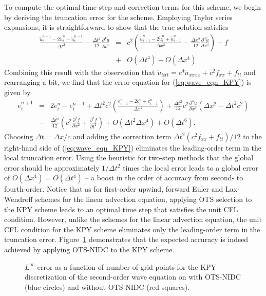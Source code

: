 \documentclass[fleqn,12pt,twoside]{article}
\newcommand{\bea}{\begin{eqnarray}}
\newcommand{\eea}{\end{eqnarray}}
\def\pt{\partial t}
\def\px{\partial x}
\def\tu{\tilde{u}}
\def\dt{\Delta t}
\def\dx{\Delta x}
\begin{document}
To compute the optimal time step and correction terms for this scheme, we
begin by deriving the truncation error for the scheme.  Employing Taylor 
series expansions, it is straightforward to show that the true solution 
satisfies
\bea
  \frac{\tu^{n+1}_i - 2 \tu^n_i + \tu^{n-1}_i}{\dt^2}
    - \frac{\dt^2}{12} \frac{\partial^4 \tu}{\pt^4}
  &=& c^2 \left( \frac{\tu^{n}_{i+1} - 2 \tu^n_i + \tu^n_{i-1}}{\dx^2}
  -\frac{\dx^2}{12} \frac{\partial^4 \tu}{\px^4} \right) + f
  \nonumber \\
  &+& O(\dt^4) + O(\dx^4) 
\eea
Combining this result with the observation that
$\tu_{tttt} = c^4 \tu_{xxxx} + c^2 f_{xx} + f_{tt}$ and rearranging a bit, 
we find that the error equation for (\ref{eq:wave_eqn_KPY}) is given by
\bea
  e^{n+1}_i &=& 2 e^n_i - e^{n-1}_i
  + \dt^2 c^2 \left( \frac{e^{n}_{i+1} - 2 e^n_i + e^n_{i-1}}{\dx^2} \right)
  + \frac{\dt^2}{12} c^2 \frac{\partial^4 \tu}{\px^4} 
    \left( \dx^2 - \dt^2 c^2 \right)
  \nonumber \\
  &-& \frac{\dt^4}{12} \left( c^2 \frac{\partial^2 f}{\px^2} 
                            + \frac{\partial^2 f}{\pt^2} \right)
      + O(\dt^2 \dx^4) + O(\dt^6).
\eea
Choosing $\dt = \dx/c$ and adding the correction term 
$\dt^2 \left(c^2 f_{xx} + f_{tt} \right)/12$ to the right-hand side of 
(\ref{eq:wave_eqn_KPY}) eliminates the leading-order term in the local 
truncation error.  Using the heuristic for two-step methods that the global 
error should be approximately $1/\dt^2$ times the local error leads to a 
global error of $O(\dx^4) = O(\dt^4)$ -- a boost in the order of accuracy 
from second- to fourth-order.  Notice that as for first-order upwind, forward 
Euler and Lax-Wendroff schemes for the linear advection equation, applying OTS 
selection to the KPY scheme leads to an optimal time step that satisfies the 
unit CFL condition.  However, unlike the schemes for the linear advection 
equation, the unit CFL condition for the KPY scheme eliminates only the 
leading-order term in the truncation error.  Figure~\ref{fig:wave_eqn_1d_error} 
demonstrates that the expected accuracy is indeed achieved by applying 
OTS-NIDC to the KPY scheme.  
\begin{figure}[tb]
\begin{center}
\caption{$L^\infty$ error as a function of number of grid points for the
  KPY discretization of the second-order wave equation on with OTS-NIDC 
  (blue circles) and without OTS-NIDC (red squares).
}
\label{fig:wave_eqn_1d_error}
\end{center}
\end{figure}
\end{document}
